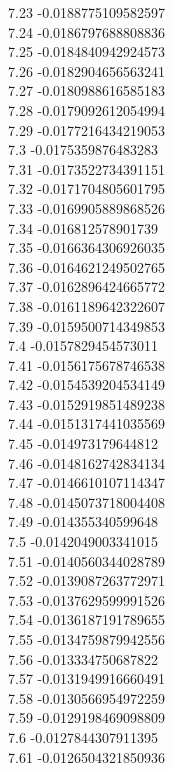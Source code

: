 {7.23	-0.0188775109582597\\
7.24	-0.0186797688808836\\
7.25	-0.0184840942924573\\
7.26	-0.0182904656563241\\
7.27	-0.0180988616585183\\
7.28	-0.0179092612054994\\
7.29	-0.0177216434219053\\
7.3	-0.0175359876483283\\
7.31	-0.0173522734391151\\
7.32	-0.0171704805601795\\
7.33	-0.0169905889868526\\
7.34	-0.016812578901739\\
7.35	-0.0166364306926035\\
7.36	-0.0164621249502765\\
7.37	-0.0162896424665772\\
7.38	-0.0161189642322607\\
7.39	-0.0159500714349853\\
7.4	-0.0157829454573011\\
7.41	-0.0156175678746538\\
7.42	-0.0154539204534149\\
7.43	-0.0152919851489238\\
7.44	-0.0151317441035569\\
7.45	-0.014973179644812\\
7.46	-0.0148162742834134\\
7.47	-0.0146610107114347\\
7.48	-0.0145073718004408\\
7.49	-0.014355340599648\\
7.5	-0.0142049003341015\\
7.51	-0.0140560344028789\\
7.52	-0.0139087263772971\\
7.53	-0.0137629599991526\\
7.54	-0.0136187191789655\\
7.55	-0.0134759879942556\\
7.56	-0.013334750687822\\
7.57	-0.0131949916660491\\
7.58	-0.0130566954972259\\
7.59	-0.0129198469098809\\
7.6	-0.0127844307911395\\
7.61	-0.0126504321850936\\
}
